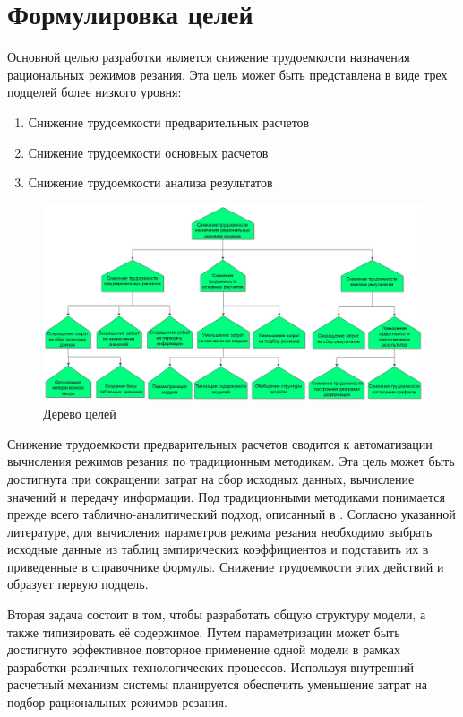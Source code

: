 \documentclass[14pt,oneside,final]{extreport}
\begin{document}
	\section{Формулировка целей}
	Основной целью разработки является снижение трудоемкости назначения рациональных режимов резания. Эта цель может быть представлена в виде трех подцелей более низкого уровня: 
	\begin{enumerate}
	\item Снижение трудоемкости предварительных расчетов
	\item Снижение трудоемкости основных расчетов
	\item Снижение трудоемкости анализа результатов 
	\end{enumerate}
	\begin{figure}[!h]
	\begin{center}
	\includegraphics[scale=0.55]{img/at} 
	\end{center}
	\caption{Дерево целей}
	\label{fig:aim-tree}
	\end{figure}
	
	Снижение трудоемкости предварительных расчетов сводится к автоматизации вычисления режимов резания по традиционным методикам. Эта цель может быть достигнута при сокращении затрат на сбор исходных данных, вычисление значений и передачу информации. Под традиционными методиками понимается прежде всего таблично-аналитический подход, описанный в \cite{book:Kosilova}. Согласно указанной литературе, для вычисления параметров режима резания необходимо выбрать исходные данные из таблиц эмпирических коэффициентов и подставить их в приведенные в справочнике формулы. Снижение трудоемкости этих действий и образует первую подцель.
	
	Вторая задача состоит в том, чтобы разработать общую структуру модели, а также типизировать её содержимое. Путем параметризации может быть достигнуто эффективное повторное применение одной модели в рамках разработки различных технологических процессов. Используя внутренний расчетный механизм системы планируется обеспечить уменьшение затрат на подбор рациональных режимов резания. 
	
\end{document}
